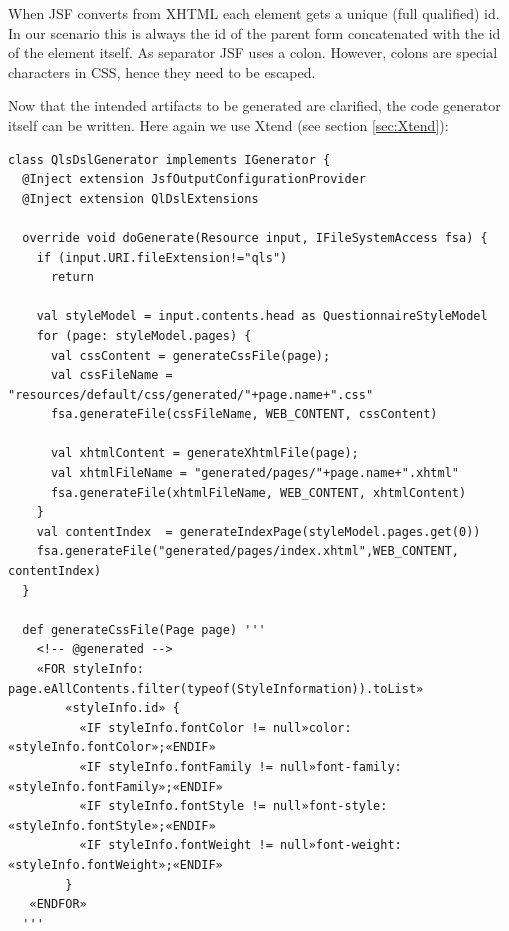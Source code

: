 When JSF converts from XHTML each element gets a unique (full qualified) id. In
our scenario this is always the id of the parent form concatenated with the id
of the element itself. As separator JSF uses a colon. However, colons are
special characters in CSS, hence they need to be escaped.

Now that the intended artifacts to be generated are clarified, the code generator
itself can be written. Here again we use Xtend (see section \ref{sec:Xtend}):
\newline \newline
\begin{lstlisting}[language=Xtend]
class QlsDslGenerator implements IGenerator {
  @Inject extension JsfOutputConfigurationProvider
  @Inject extension QlDslExtensions
  
  override void doGenerate(Resource input, IFileSystemAccess fsa) {
    if (input.URI.fileExtension!="qls")
      return
            
    val styleModel = input.contents.head as QuestionnaireStyleModel
    for (page: styleModel.pages) {
      val cssContent = generateCssFile(page);
   	  val cssFileName = "resources/default/css/generated/"+page.name+".css"
   	  fsa.generateFile(cssFileName, WEB_CONTENT, cssContent)
   	
   	  val xhtmlContent = generateXhtmlFile(page);
   	  val xhtmlFileName = "generated/pages/"+page.name+".xhtml"
   	  fsa.generateFile(xhtmlFileName, WEB_CONTENT, xhtmlContent)
    }
    val contentIndex  = generateIndexPage(styleModel.pages.get(0))
    fsa.generateFile("generated/pages/index.xhtml",WEB_CONTENT, contentIndex)
  }

  def generateCssFile(Page page) '''
  	<!-- @generated -->
    «FOR styleInfo: page.eAllContents.filter(typeof(StyleInformation)).toList»
		«styleInfo.id» {
		  «IF styleInfo.fontColor != null»color: «styleInfo.fontColor»;«ENDIF»
		  «IF styleInfo.fontFamily != null»font-family: «styleInfo.fontFamily»;«ENDIF»
		  «IF styleInfo.fontStyle != null»font-style: «styleInfo.fontStyle»;«ENDIF»
		  «IF styleInfo.fontWeight != null»font-weight: «styleInfo.fontWeight»;«ENDIF»
		}
   «ENDFOR»
  '''
	

\end{lstlisting}
